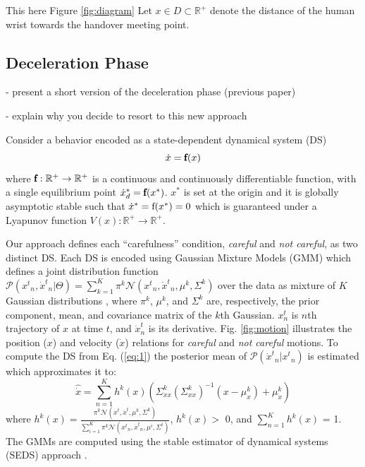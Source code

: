 This here Figure \ref{fig:diagram}
Let $x \in D \subset \mathbb{R}^{+}$ denote the distance of the human wrist towards the handover meeting point. 

\subsection{Deceleration Phase}

- present a short version of the deceleration phase (previous paper)

- explain why you decide to resort to this new approach


Consider a behavior encoded as a state-dependent dynamical system (DS)
%
\begin{equation}
\dot{x} = \pmb{\textnormal{f}}(x)
\label{eq:1}
\end{equation}
where $\pmb{\textnormal{f}}:\mathbb{R}^{+} \to \mathbb{R}^{+}$ is a continuous and continuously differentiable function, with a single equilibrium point ${\dot{x}_d}^* = \pmb{\textnormal{f}}(x^*)$. $x^{*}$ is set at the origin and it is globally asymptotic stable such that $\dot{x}^* = \textnormal{f}(x^{*}) = 0$ which is guaranteed under a Lyapunov function $V(x):\mathbb{R}^{+} \rightarrow \mathbb{R}^{+}$.

Our approach defines each ``carefulness'' condition, \textit{careful} and \textit{not careful}, as two distinct DS. Each DS is encoded using Gaussian Mixture Models (GMM) which defines a joint distribution function $\mathcal{P}({{x}^{t}}_n, {\dot{x}^{t}}_n | \Theta) = \sum_{k=1}^{K} \pi^{k} \mathcal{N}({{x}^{t}}_n, {\dot{x}^{t}}_n, \mu^{k}, \Sigma^{k})$ over the data as mixture of $K$ Gaussian distributions \cite{khansari2011learning}, where $\pi^{k}$, $\mu^{k}$, and $\Sigma^{k}$ are, respectively, the prior component, mean, and covariance matrix of the $k$th Gaussian. $x_n^t$ is $n$th trajectory of $x$ at time $t$, and $\dot{x}_n^t$ is its derivative. Fig. \ref{fig:motion} illustrates the position ($x$) and velocity ($\dot{x}$) relations for \textit{careful} and \textit{not careful} motions. To compute the DS from Eq. (\ref{eq:1}) the posterior mean of $\mathcal{P}({\dot{x}^{t}}_n|{{x}^{t}}_n)$ is estimated which approximates it to:
%
\begin{equation}
\hat{\dot{x}} = \sum_{n=1}^{K} h^{k}(x) (\Sigma^{k}_{\dot{x}x}(\Sigma^{k}_{xx})^{-1} (x - \mu^{k}_{x}) + \mu^{k}_{\dot{x}})
\label{eq:2}
\end{equation}
where $h^{k}(x) = \frac{\pi^{k} \mathcal{N}({{x}^{t}}, {\dot{x}^{t}}, \mu^{k}, \Sigma^{k})}{\sum_{i=1}^{K} \pi^{k} \mathcal{N}({{x}^{t}}_n, {\dot{x}^{t}}_n, \mu^{i}, \Sigma^{i})}$, $h^{k}(x) > $ 0, and $\sum_{n=1}^{K} h^{k}(x)$ = 1. The GMMs are computed using the stable estimator of dynamical systems (SEDS) approach \cite{khansari2011learning}. 


